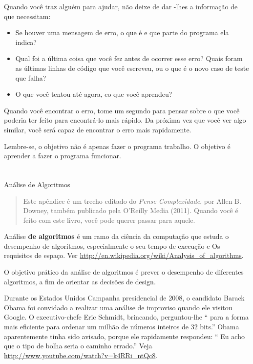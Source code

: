 \documentclass[10pt]{book}
\begin{document}
\begin{v erbatim}
Quando você traz alguém para ajudar, não deixe de dar
-lhes a informação de que necessitam:

\begin{itemize}

\item Se houver uma mensagem de erro, o que é
e que parte do programa ela indica?

\item Qual foi a última coisa que você fez antes de ocorrer esse erro?
Quais foram as últimas linhas de código que você escreveu, ou o que é
o novo caso de teste que falha?

\item O que você tentou até agora, eo que você aprendeu?

\end{itemize}

Quando você encontrar o erro, tome um segundo para pensar sobre o que você
poderia ter feito para encontrá-lo mais rápido. Da próxima vez que você ver algo
similar, você será capaz de encontrar o erro mais rapidamente.

Lembre-se, o objetivo não é apenas fazer o programa
trabalho. O objetivo é aprender a fazer o programa funcionar.


\chapter{} Análise de Algoritmos

\begin{quote}
Este apêndice é um trecho editado do {\it Pense Complexidade}, por
Allen B. Downey, também publicado pela O'Reilly Media (2011). Quando você
é feito com este livro, você pode querer passar para aquele.
\end{quote}

{Análise \bf de algoritmos} é um ramo da ciência da computação que
estuda o desempenho de algoritmos, especialmente o seu tempo de execução e
Os requisitos de espaço. Ver
\url{http://en.wikipedia.org/wiki/Analysis_of_algorithms}.
 

O objetivo prático da análise de algoritmos é prever o desempenho
de diferentes algoritmos, a fim de orientar as decisões de design.

Durante os Estados Unidos Campanha presidencial de 2008, o candidato
Barack Obama foi convidado a realizar uma análise de improviso quando
ele visitou Google. O executivo-chefe Eric Schmidt, brincando, perguntou-lhe
`` para a forma mais eficiente para ordenar um milhão de números inteiros de 32 bits.''
Obama aparentemente tinha sido avisado, porque ele rapidamente
respondeu: `` Eu acho que o tipo de bolha seria o caminho errado.''
Veja \url{http://www.youtube.com/watch?v=k4RRi_ntQc8}.


\end{v erbatim}
\end{document}
